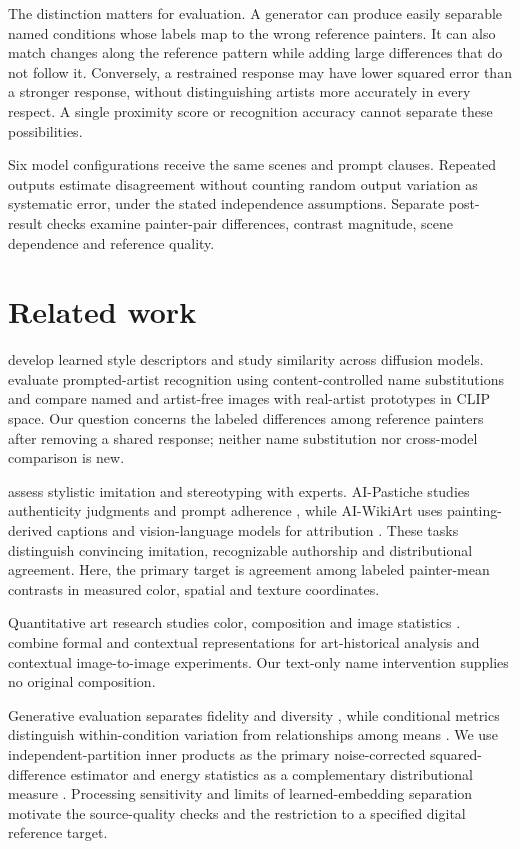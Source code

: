 \documentclass[11pt]{article}
\begin{document}
The distinction matters for evaluation. A generator can produce easily
separable named conditions whose labels map to the wrong reference painters.
It can also match changes along the reference pattern while adding large
differences that do not follow it. Conversely, a restrained response may have lower squared
error than a stronger response, without distinguishing artists more accurately
in every respect. A single proximity score or recognition accuracy cannot
separate these possibilities.

Six model configurations receive the same scenes and prompt clauses.
Repeated outputs estimate
disagreement without counting random output variation as systematic error, under
the stated independence assumptions. Separate post-result checks examine
painter-pair differences, contrast magnitude, scene dependence and reference quality.

\section{Related work}
\citet{somepalli2024style} develop learned style descriptors and study similarity
across diffusion models. \citet{su2025prompted} evaluate prompted-artist
recognition using content-controlled name substitutions and compare named and
artist-free images with real-artist prototypes in CLIP space. Our question
concerns the labeled differences among reference painters after removing a
shared response; neither name substitution nor cross-model comparison is new.

\citet{deliege2025} assess stylistic imitation and stereotyping with experts.
AI-Pastiche studies authenticity judgments and prompt adherence
\citep{asperti2025pastiche}, while AI-WikiArt uses painting-derived captions and
vision-language models for attribution \citep{fu2025aiwikiart}. These tasks
distinguish convincing imitation, recognizable authorship and distributional
agreement. Here, the primary target is agreement among labeled painter-mean contrasts
in measured color, spatial and texture coordinates.

Quantitative art research studies color, composition and image statistics
\citep{kim2014,sigaki2018,lee2020}. \citet{kim2026} combine formal and contextual
representations for art-historical analysis and contextual image-to-image
experiments. Our text-only name intervention supplies no original composition.

Generative evaluation separates fidelity and diversity \citep{naeem2020},
while conditional metrics distinguish within-condition variation from relationships
among means \citep{benny2021conditional}. We use independent-partition inner products
as the primary noise-corrected squared-difference estimator \citep{diedrichsen2017representational}
and energy statistics as a complementary distributional measure \citep{szekely2013}.
Processing sensitivity \citep{parmar2022} and limits of learned-embedding
separation \citep{asperti2026} motivate the source-quality checks and the
restriction to a specified digital reference target.
\end{document}
